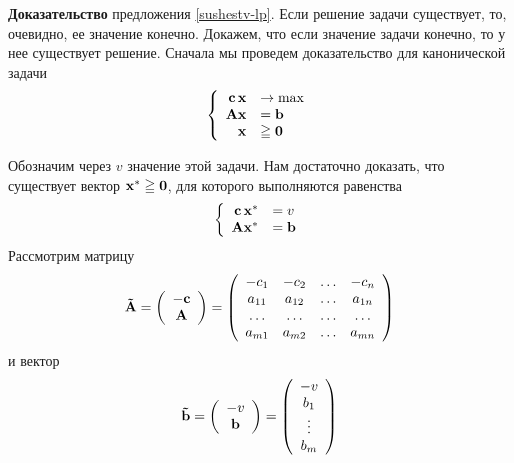 \textbf{Доказательство} предложения \ref{sushestv-lp}. Если решение
задачи существует, то, очевидно, ее значение конечно. Докажем, что
если значение задачи конечно, то у нее существует решение. Сначала
мы проведем доказательство для канонической задачи
\begin{equation}\label{KZLPV-1}
\left\{
\begin{array}{rl}
 \mathbf{c} \, \mathbf{x} & \to \max  \\
 \mathbf{A} \mathbf{x} &= \mathbf{b} \\
 \mathbf{x} &\geqq \mathbf{0}\\
\end{array} \right.
\end{equation}

Обозначим через $v$ значение этой задачи. Нам достаточно доказать,
что существует вектор $\mathbf{x^{*}} \geqq \mathbf{0}$, для которого
выполняются равенства
\begin{equation}\label{KZLPV-2}
\left\{
\begin{array}{rl}
 \mathbf{c} \, \mathbf{x^{*}} & = v  \\
 \mathbf{A} \mathbf{x^{*}} &= \mathbf{b} \\
 \end{array} \right.
\end{equation}
    Рассмотрим матрицу
\[\mathbf{\tilde{A}}=\left(
                   \begin{array}{c}
                     \mathbf{-c} \\
                     \mathbf{A} \\
                   \end{array}
                 \right)
=\left(
                   \begin{array}{cccc}
                     -c_{1} & -c_{2} & \ldots & -c_{n} \\
                     a_{11} & a_{12} & \ldots & a_{1n} \\
                     \ldots & \ldots & \ldots & \ldots \\
                     a_{m1} & a_{m2} & \ldots & a_{mn}\\
                   \end{array}
                 \right)
\]
    и вектор
\[\mathbf{\tilde{b}}=\left(
                   \begin{array}{c}
                     -v \\
                     \mathbf{b} \\
                   \end{array}
                 \right)
=\left(
   \begin{array}{c}
     -v \\
     b_{1} \\
     \vdots \\
     b_{m} \\
   \end{array}
 \right)
\]
